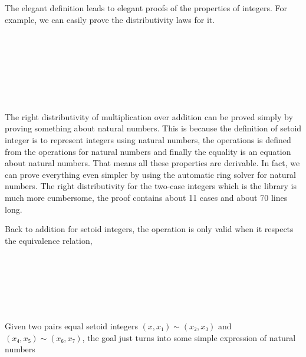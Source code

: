 \documentclass{article}
\begin{document}
The elegant definition leads to elegant proofs of the properties of integers. For example, we can easily prove the distributivity laws for it.


\begin{code}\>\<%
\\
%
\\
\>\<%
\\
\>\<%
\\
\>\<%
\\
%
\\
\>\<\end{code}

The right distributivity of multiplication over addition can be proved simply by proving something about natural numbers. This is because the definition of setoid integer is to represent integers using natural numbers, the operations is defined from the operations for natural numbers and finally the equality is an equation about natural numbers. That means all these properties are derivable. In fact, we can prove everything even simpler by using the automatic ring solver for natural numbers. The right distributivity for the two-case integers which is the library is much more cumbersome, the proof contains about 11 cases and about 70 lines long.


Back to addition for setoid integers, the operation is only valid when it respects the equivalence relation,

\begin{code}\>\<%
\\
%
\\
\> \AgdaSymbol{:} \AgdaSymbol{\{} \AgdaSymbol{:} \AgdaSymbol{\}}       \AgdaSymbol{\_}  \<%
\\
\>   \AgdaSymbol{=}               \AgdaSymbol{(}  \AgdaSymbol{)}  \AgdaSymbol{(}  \AgdaSymbol{)}\<%
\\
%
\\
\>\<\end{code}
Given two pairs equal setoid integers $(x , x₁) ∼ (x₂ , x₃)$ and $(x₄ , x₅) ∼ (x₆ , x₇)$, the goal just turns into some simple expression of natural numbers
\end{document}
